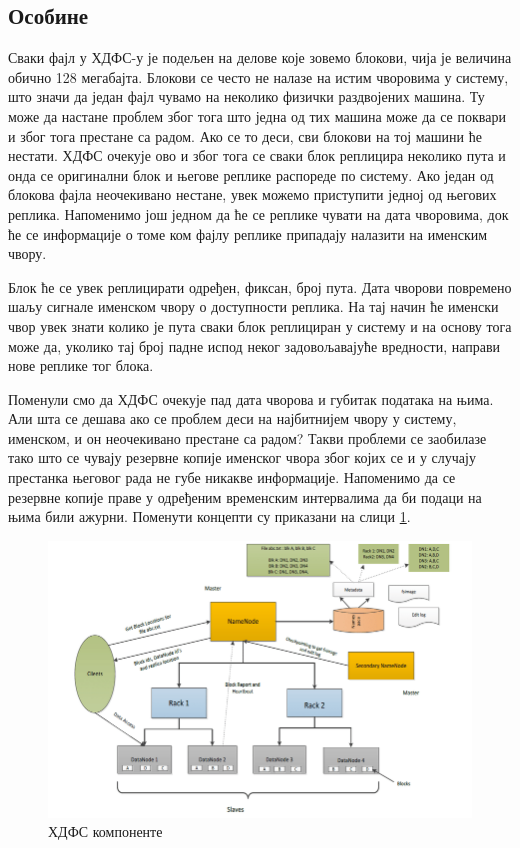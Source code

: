 \documentclass[12pt,oneside]{memoir}
\begin{document}
\subsection{Особине}
\label{subsec:hdfs_osobine}

Сваки фајл у ХДФС-у је подељен на делове које зовемо блокови, чија је величина обично 128 мегабајта. Блокови се често не налазе на истим чворовима у систему, што значи да један фајл чувамо на неколико физички раздвојених машина. Ту може да настане проблем због тога што једна од тих машина може да се поквари и због тога престане са радом. Ако се то деси, сви блокови на тој машини ће нестати. ХДФС очекује ово и због тога се сваки блок реплицира неколико пута и онда се оригинални блок и његове реплике распореде по систему. Ако један од блокова фајла неочекивано нестане, увек можемо приступити једној од његових реплика. Напоменимо још једном да ће се реплике чувати на дата чворовима, док ће се информације о томе ком фајлу реплике припадају налазити на именским чвору. \cite{hadoop_arch_guide}

Блок ће се увек реплицирати одређен, фиксан, број пута. Дата чворови повремено шаљу сигнале именском чвору о доступности реплика. На тај начин ће именски чвор увек знати колико је пута сваки блок реплициран у систему и на основу тога може да, уколико тај број падне испод неког задовољавајуће вредности, направи нове реплике тог блока. \cite{hadoop_arch_guide}

Поменули смо да ХДФС очекује пад дата чворова и губитак података на њима. Али шта се дешава ако се проблем деси на најбитнијем чвору у систему, именском, и он неочекивано престане са радом? Такви проблеми се заобилазе тако што се чувају резервне копије именског чвора због којих се и у случају престанка његовог рада не губе никакве информације. Напоменимо да се резервне копије праве у одређеним временским интервалима да би подаци на њима били ажурни. Поменути концепти су приказани на слици \ref{fig:hadoop_sistem}.

\begin{figure}[!ht]
  \centering
  \includegraphics[width=1\textwidth]{pictures/hadoop_system.png}
  \caption{ХДФС компоненте}
  \label{fig:hadoop_sistem}
\end{figure}
\end{document}
